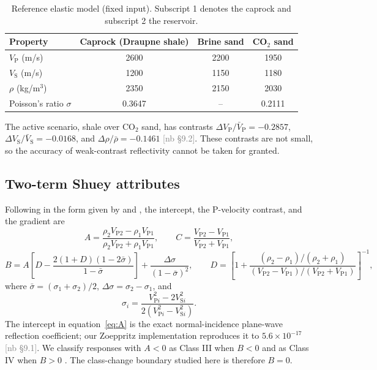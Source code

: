 \documentclass[11pt]{article}
\newcommand{\VP}{V_\mathrm{P}}
\newcommand{\VS}{V_\mathrm{S}}
\newif\ifshownb \shownbtrue
\newcommand{\nb}[1]{\ifshownb\textcolor{gray}{[nb #1]}\fi}
\begin{document}
\begin{table}[htbp]
\centering
\caption{Reference elastic model (fixed input). Subscript 1 denotes the caprock and subscript 2 the reservoir.}
\label{tab:model}
\begin{tabular}{lccc}
\toprule
Property & Caprock (Draupne shale) & Brine sand & CO$_2$ sand \\
\midrule
$\VP$ (m/s) & 2600 & 2200 & 1950 \\
$\VS$ (m/s) & 1200 & 1150 & 1180 \\
$\rho$ (kg/m$^3$) & 2350 & 2150 & 2030 \\
Poisson's ratio $\sigma$ & 0.3647 & -- & 0.2111 \\
\bottomrule
\end{tabular}
\end{table}

The active scenario, shale over CO$_2$ sand, has contrasts $\Delta\VP/\bar V_\mathrm{P}=-0.2857$, $\Delta\VS/\bar V_\mathrm{S}=-0.0168$, and $\Delta\rho/\bar\rho=-0.1461$ \nb{\S9.2}. These contrasts are not small, so the accuracy of weak-contrast reflectivity cannot be taken for granted.

\subsection*{Two-term Shuey attributes}

Following \citet{shuey1985} in the form given by \citet{castagna1993} and \citet{wiggins1983}, the intercept, the P-velocity contrast, and the gradient are
\begin{equation}
A=\frac{\rho_2V_{\mathrm{P}2}-\rho_1V_{\mathrm{P}1}}{\rho_2V_{\mathrm{P}2}+\rho_1V_{\mathrm{P}1}},\qquad
C=\frac{V_{\mathrm{P}2}-V_{\mathrm{P}1}}{V_{\mathrm{P}2}+V_{\mathrm{P}1}},
\label{eq:A}
\end{equation}
\begin{equation}
B=A\left[D-\frac{2(1+D)(1-2\bar\sigma)}{1-\bar\sigma}\right]+\frac{\Delta\sigma}{(1-\bar\sigma)^2},\qquad
D=\left[1+\frac{(\rho_2-\rho_1)/(\rho_2+\rho_1)}{(V_{\mathrm{P}2}-V_{\mathrm{P}1})/(V_{\mathrm{P}2}+V_{\mathrm{P}1})}\right]^{-1},
\label{eq:B}
\end{equation}
where $\bar\sigma=(\sigma_1+\sigma_2)/2$, $\Delta\sigma=\sigma_2-\sigma_1$, and
\begin{equation}
\sigma_i=\frac{V_{\mathrm{P}i}^2-2V_{\mathrm{S}i}^2}{2\left(V_{\mathrm{P}i}^2-V_{\mathrm{S}i}^2\right)}.
\label{eq:sigma}
\end{equation}
The intercept in equation~\ref{eq:A} is the exact normal-incidence plane-wave reflection coefficient; our Zoeppritz implementation reproduces it to $5.6\times10^{-17}$ \nb{\S9.1}. We classify responses with $A<0$ as Class III when $B<0$ and as Class IV when $B>0$ \citep{castagna1998}. The class-change boundary studied here is therefore $B=0$.
\end{document}
